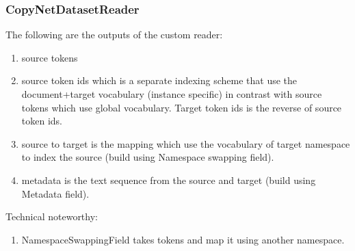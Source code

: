 \documentclass{article}
\begin{document}
\subsubsection{CopyNetDatasetReader}
The following are the outputs of the custom reader:
\begin{enumerate}
  \item source tokens
  \item source token ids which is a separate indexing scheme that use the document+target vocabulary (instance specific) in contrast with source tokens which use global vocabulary. Target token ids is the reverse of source token ids.
  \item source to target is the mapping which use the vocabulary of target namespace to index the source (build using Namespace swapping field).
  \item metadata is the text sequence from the source and target (build using Metadata field).
\end{enumerate}

Technical noteworthy:
\begin{enumerate}
  \item NamespaceSwappingField takes tokens and map it using another namespace.
\end{enumerate}
\end{document}
